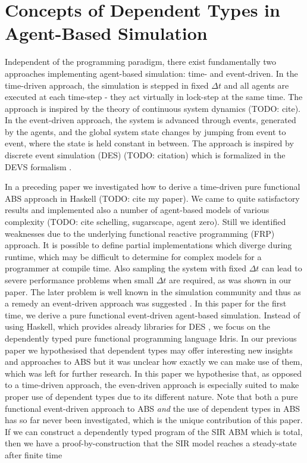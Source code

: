 \section{Concepts of Dependent Types in Agent-Based Simulation}
Independent of the programming paradigm, there exist fundamentally two approaches implementing agent-based simulation: time- and event-driven. In the time-driven approach, the simulation is stepped in fixed $\Delta t$ and all agents are executed at each time-step - they act virtually in lock-step at the same time. The approach is inspired by the theory of continuous system dynamics (TODO: cite).
In the event-driven approach, the system is advanced through events, generated by the agents, and the global system state changes by jumping from event to event, where the state is held constant in between. The approach is inspired by discrete event simulation (DES) (TODO: citation) which is formalized in the DEVS formalism \cite{zeigler_theory_2000}.

In a preceding paper we investigated how to derive a time-driven pure functional ABS approach in Haskell (TODO: cite my paper). We came to quite satisfactory results and implemented also a number of agent-based models of various complexity (TODO: cite schelling, sugarscape, agent zero). Still we identified weaknesses due to the underlying functional reactive programming (FRP) approach. It is possible to define partial implementations which diverge during runtime, which may be difficult to determine for complex models for a programmer at compile time. Also sampling the system with fixed $\Delta t$ can lead to severe performance problems when small $\Delta t$ are required, as was shown in our paper. The later problem is well known in the simulation community and thus as a remedy an event-driven approach was suggested \cite{meyer_event-driven_2014}.
In this paper for the first time, we derive a pure functional event-driven agent-based simulation. Instead of using Haskell, which provides already libraries for DES \cite{sorokin_aivika_2015}, we focus on the dependently typed pure functional programming language Idris. In our previous paper we hypothesised that dependent types may offer interesting new insights and approaches to ABS but it was unclear how exactly we can make use of them, which was left for further research. In this paper we hypothesise that, as opposed to a time-driven approach, the even-driven approach is especially suited to make proper use of dependent types due to its different nature. Note that both a pure functional event-driven approach to ABS \textit{and} the use of dependent types in ABS has so far never been investigated, which is the unique contribution of this paper.
If we can construct a dependently typed program of the SIR ABM which is total, then we have a proof-by-construction that the SIR model reaches a steady-state after finite time

